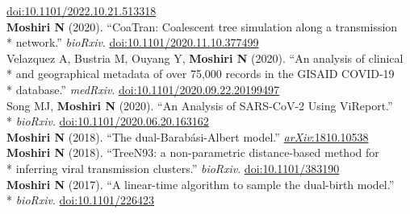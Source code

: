 \documentclass[margin,line]{res}
\begin{document}
\begin{resume}
\hspace*{8mm} \href{https://doi.org/10.1101/2022.10.21.513318}{doi:10.1101/2022.10.21.513318}\\
\hspace*{4mm} \textbf{Moshiri N} (2020). ``CoaTran: Coalescent tree simulation along a transmission\\*\vspace{2mm}
\hspace*{8mm} network.'' \textit{bioRxiv}. \href{https://doi.org/10.1101/2020.11.10.377499}{doi:10.1101/2020.11.10.377499}\\
\hspace*{4mm} Velazquez A, Bustria M, Ouyang Y, \textbf{Moshiri N} (2020). ``An analysis of clinical\\*
\hspace*{9mm} and geographical metadata of over 75,000 records in the GISAID COVID-19\\*\vspace{2mm}
\hspace*{8mm} database.'' \textit{medRxiv}. \href{https://doi.org/10.1101/2020.09.22.20199497}{doi:10.1101/2020.09.22.20199497}\\
\hspace*{4mm} Song MJ, \textbf{Moshiri N} (2020). ``An Analysis of SARS-CoV-2 Using ViReport.''\\*\vspace{2mm}
\hspace*{8mm} \textit{bioRxiv}. \href{https://doi.org/10.1101/2020.06.20.163162}{doi:10.1101/2020.06.20.163162}\\
\hspace*{4mm} \vspace{2mm}\textbf{Moshiri N} (2018). ``The dual-Barab\'asi-Albert model.'' \href{https://arxiv.org/abs/1810.10538}{\textit{arXiv}:1810.10538}\\
\hspace*{4mm} \textbf{Moshiri N} (2018). ``TreeN93: a non-parametric distance-based method for\\*\vspace{2mm}
\hspace*{8mm} inferring viral transmission clusters.'' \textit{bioRxiv}. \href{https://doi.org/10.1101/383190}{doi:10.1101/383190}\\
\hspace*{4mm} \textbf{Moshiri N} (2017). ``A linear-time algorithm to sample the dual-birth model.''\\*\vspace{2mm}
\hspace*{8mm} \textit{bioRxiv}. \href{https://doi.org/10.1101/226423}{doi:10.1101/226423}\\


\end{resume}
\end{document}
